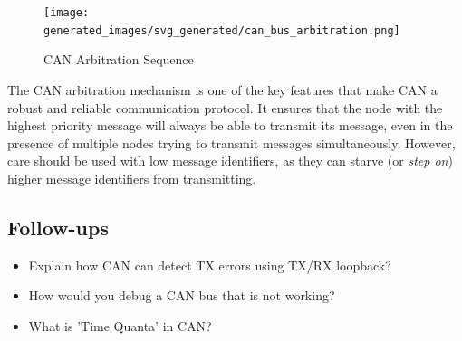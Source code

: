 \documentclass[main.tex]{subfiles}
\begin{document}
\begin{figure}[H]
    \centering
    \texttt{[image: generated\_images/svg\_generated/can\_bus\_arbitration.png]}
    \caption{CAN Arbitration Sequence}
    \label{fig:can-arbitration}
\end{figure}

\noindent The CAN arbitration mechanism is one of the key features that make CAN a robust and reliable communication protocol. It ensures that the node with the highest priority message will always be able to transmit its message, even in the presence of multiple nodes trying to transmit messages simultaneously. However, care should be used with low message identifiers, as they can starve (or \textit{step on}) higher message identifiers from transmitting.

\subsection{Follow-ups}
\begin{itemize}
    \item Explain how CAN can detect TX errors using TX/RX loopback?
    \item How would you debug a CAN bus that is not working?
    \item What is 'Time Quanta' in CAN?
\end{itemize}
\end{document}
